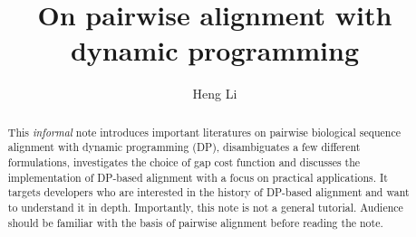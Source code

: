 \documentclass{bioinfo}
\begin{document}

\title[Pairwise alignment with DP]{On pairwise alignment with dynamic programming}
\author[Li]{Heng Li}
\address{Broad Institute, 415 Main Street, Cambridge, MA 02142, USA}

\maketitle

\begin{abstract}
This \emph{informal} note introduces important literatures on pairwise
biological sequence alignment with dynamic programming (DP), disambiguates a
few different formulations, investigates the choice of gap cost function and
discusses the implementation of DP-based alignment with a focus on practical
applications. It targets developers who are interested in the history of
DP-based alignment and want to understand it in depth.  Importantly, this note
is not a general tutorial. Audience should be familiar with the basis of
pairwise alignment before reading the note.
\end{abstract}
\end{document}
